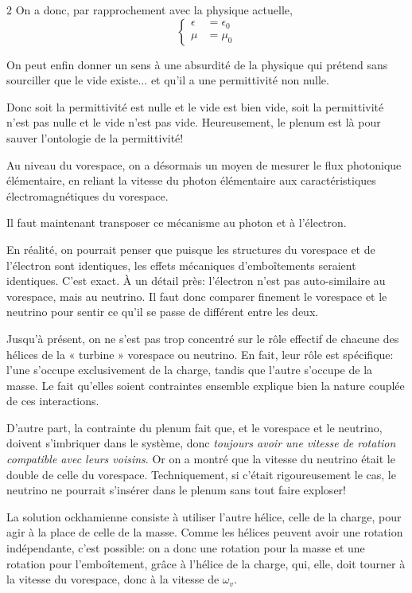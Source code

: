 \begin{multicols}{2}
On a donc, par rapprochement avec la physique actuelle,
\begin{equation*}
	\left\{
	\begin{split}
		\epsilon &= \epsilon_0 \\
		\mu      &= \mu_0
	\end{split}
	\right.
\end{equation*}

On peut enfin donner un sens à une absurdité de la physique qui
prétend sans sourciller que le vide existe$\ldots$ et qu'il a une
permittivité non nulle.

Donc soit la permittivité est nulle et le vide est bien vide, soit la
permittivité n'est pas nulle et le vide n'est pas vide. Heureusement,
le plenum est là pour sauver l'ontologie de la permittivité!
\medskip

Au niveau du vorespace, on a désormais un moyen de mesurer le
flux photonique élémentaire, en reliant la vitesse du photon
élémentaire aux caractéristiques électromagnétiques du vorespace.

Il faut maintenant transposer ce mécanisme au photon et à l'électron.

En réalité, on pourrait penser que puisque les structures du vorespace et de l'électron sont identiques, les effets mécaniques d'emboîtements seraient identiques. C'est exact. À un détail près: l'électron n'est pas auto-similaire au vorespace, mais au neutrino. Il faut donc comparer finement le vorespace et le neutrino pour sentir ce qu'il se passe de différent entre les deux.

Jusqu'à présent, on ne s'est pas trop concentré sur le rôle effectif de chacune des hélices de la « turbine » vorespace ou neutrino. En fait, leur rôle est spécifique: l'une s'occupe exclusivement de la charge, tandis que l'autre s'occupe de la masse. Le fait qu'elles soient contraintes ensemble explique bien la nature couplée de ces interactions.

D'autre part, la contrainte du plenum fait que, et le vorespace et le neutrino, doivent s'imbriquer dans le système, donc \textit{toujours avoir une vitesse de rotation compatible avec leurs voisins}. Or on a montré que la vitesse du neutrino était le double de celle du vorespace. Techniquement, si c'était rigoureusement le cas, le neutrino ne pourrait s'insérer dans le plenum sans tout faire exploser!

La solution ockhamienne consiste à utiliser l'autre hélice, celle de la charge, pour agir à la place de celle de la masse. Comme les hélices peuvent avoir une rotation indépendante, c'est possible: on a donc une rotation pour la masse et une rotation pour l'emboîtement, grâce à l'hélice de la charge, qui, elle, doit tourner à la vitesse du vorespace, donc à la vitesse de $\omega_v$. 


\end{multicols}
